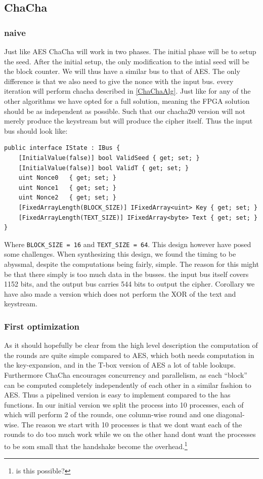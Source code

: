 \documentclass[a4paper]{article}
\begin{document}
\subsection{ChaCha}
\label{sec:orgaf322e1}

\subsubsection{naive}
\label{ChaChaNaive}
Just like AES ChaCha will work in two phases. The initial phase will be to setup the seed. After the initial setup, the only modification to the intial seed will be the block counter. We will thus have a similar bus to that of AES. The only difference is that we also need to give the nonce with the input bus. every iteration will perform chacha described in \ref{ChaChaAlg}. Just like for any of the other algorithms we have opted for a full solution, meaning the FPGA solution should be as independent as possible. Such that our chacha20 version will not merely produce the keystream but will produce the cipher itself. Thus the input bus should look like:
\begin{verbatim}
public interface IState : IBus {
    [InitialValue(false)] bool ValidSeed { get; set; }
    [InitialValue(false)] bool ValidT { get; set; }
    uint Nonce0   { get; set; }
    uint Nonce1   { get; set; }
    uint Nonce2   { get; set; }
    [FixedArrayLength(BLOCK_SIZE)] IFixedArray<uint> Key { get; set; }
    [FixedArrayLength(TEXT_SIZE)] IFixedArray<byte> Text { get; set; }
}
\end{verbatim}
Where \texttt{BLOCK\_SIZE = 16} and \texttt{TEXT\_SIZE = 64}. This design however have posed some challenges. When synthesizing this design, we found the timing to be abyssmal, despite the computations being fairly, simple. The reason for this might be that there simply is too much data in the busses. the input bus itself covers 1152 bits, and the output bus carries 544 bits to output the cipher. Corollary we have also made a version which does not perform the XOR of the text and keystream.

\subsubsection{First optimization}
\label{ChaCha1}
As it should hopefully be clear from the high level description the computation of the rounds are quite simple compared to AES, which both needs computation in the key-expansion, and in the T-box version of AES a lot of table lookups. Furthermore ChaCha encourages concurrency and parallelism, as each ``block'' can be computed completely independently of each other in a similar fashion to AES. Thus a pipelined version is easy to implement compared to the has functions. In our initial version we split the process into 10 processes, each of which will perform 2 of the rounds, one column-wise round and one diagonal-wise. The reason we start with 10 processes is that we dont want each of the rounds to do too much work while we on the other hand dont want the processes to be som small that the handshake become the overhead.\footnote{is this possible?}
\end{document}
